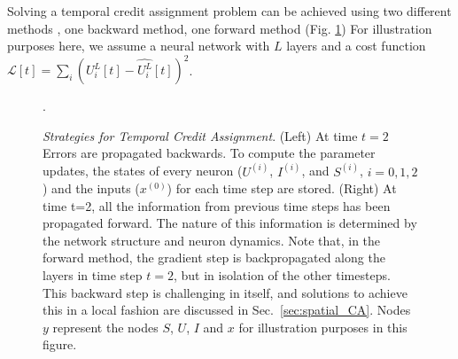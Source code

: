 \documentclass[journal,onecolumn,11pt]{IEEEtran}
\begin{document}
\label{sec:temporal_credit_assignment}
Solving a temporal credit assignment problem can be achieved using two different methods \cite{Williams_Zipser89_learalgo}, one backward method, one forward method (Fig. \ref{fig:backwrd_vs_forward_prop})
For illustration purposes here, we assume a neural network with $L$ layers and a cost function $\mathcal{L}[t] = \sum_i (U^{L}_i[t]-\hat{U^{L}_i}[t])^2$. 
%
\begin{figure}[htbp]
    \centering
  \caption{\emph{Strategies for Temporal Credit Assignment}. (Left) At time $t=2$ Errors are propagated backwards. To compute the parameter updates, the states of every neuron ($U^{(i)}$, $I^{(i)}$, and $S^{(i)}$, $i=0,1,2$) and the inputs ($x^{(0)}$) for each time step are stored. (Right) At time t=2, all the information from previous time steps has been propagated forward. The nature of this information is determined by the network structure and neuron dynamics. Note that, in the forward method, the gradient step is backpropagated along the layers in time step $t=2$, but in isolation of the other timesteps. This backward step is challenging in itself, and solutions to achieve this in a local fashion are discussed in Sec.~\ref{sec:spatial_CA}. Nodes $y$ represent the nodes $S$, $U$, $I$ and $x$ for illustration purposes in this figure.
}. 
    \label{fig:backwrd_vs_forward_prop}
\end{figure}
%
\end{document}
